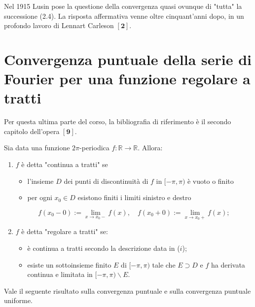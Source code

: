 \begin{oss}
    Nel 1915 Lusin pose la questione della convergenza quasi ovunque di "tutta" la successione (2.4). La risposta affermativa venne oltre cinquant'anni dopo, in un profondo lavoro di Lennart Carleson $[\mathbf{2}]$.
\end{oss}

\section{Convergenza puntuale della serie di Fourier per una funzione regolare a tratti}
Per questa ultima parte del corso, la bibliografia di riferimento è il secondo capitolo dell'opera $[\mathbf{9}]$.

\begin{boxdef}
    Sia data una funzione $2 \pi$-periodica $f: \mathbb{R} \rightarrow \mathbb{R}$. Allora:
    \begin{enumerate}[label=$\roman*)$]
        \item $f$ è detta "continua a tratti" se
        \begin{itemize}
            \item l'insieme $D$ dei punti di discontinuità di $f$ in $[-\pi, \pi)$ è vuoto o finito
            \item per ogni $x_{0} \in D$ esistono finiti i limiti sinistro e destro
        \end{itemize}
        \[f\left(x_{0}-0\right):=\lim _{x \rightarrow x_{0}-} f(x), \quad f\left(x_{0}+0\right):=\lim _{x \rightarrow x_{0}+} f(x) ;\]  
        \item $f$ è detta "regolare a tratti" se:
        \begin{itemize}
            \item è continua a tratti secondo la descrizione data in ($i$);
            \item esiste un sottoinsieme finito $E$ di $[-\pi, \pi)$ tale che $E \supset D$ e $f$ ha derivata continua e limitata in $[-\pi, \pi) \backslash E$.
        \end{itemize}
    \end{enumerate}
\end{boxdef}

Vale il seguente risultato sulla convergenza puntuale e sulla convergenza puntuale uniforme.

